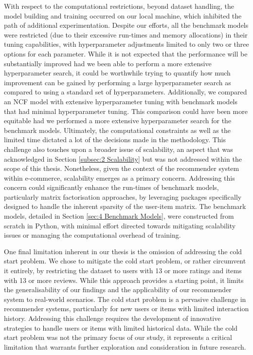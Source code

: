 With respect to the computational restrictions, beyond dataset handling, the model building and training occurred on our local machine, which inhibited the path of additional experimentation. Despite our efforts, all the benchmark models were restricted (due to their excessive run-times and memory allocations) in their tuning capabilities, with hyperparameter adjustments limited to only two or three options for each parameter. While it is not expected that the performance will be substantially improved had we been able to perform a more extensive hyperparameter search, it could be worthwhile trying to quantify how much improvement can be gained by performing a large hyperparameter search as compared to using a standard set of hyperparameters. Additionally, we compared an NCF model with extensive hyperparameter tuning with benchmark models that had minimal hyperparameter tuning. This comparison could have been more equitable had we performed a more extensive hyperparameter search for the benchmark models. Ultimately, the computational constraints as well as the limited time dictated a lot of the decisions made in the methodology. This challenge also touches upon a broader issue of scalability, an aspect that was acknowledged in Section \ref{subsec:2 Scalability} but was not addressed within the scope of this thesis. Nonetheless, given the context of the recommender system within e-commerce, scalability emerges as a primary concern. Addressing this concern could significantly enhance the run-times of benchmark models, particularly matrix factorisation approaches, by leveraging packages specifically designed to handle the inherent sparsity of the user-item matrix. The benchmark models, detailed in Section \ref{sec:4 Benchmark Models}, were constructed from scratch in Python, with minimal effort directed towards mitigating scalability issues or managing the computational overhead of training. 

One final limitation inherent in our thesis is the omission of addressing the cold start problem. We chose to mitigate the cold start problem, or rather circumvent it entirely, by restricting the dataset to users with 13 or more ratings and items with 13 or more reviews. While this approach provides a starting point, it limits the generalisability of our findings and the applicability of our recommender system to real-world scenarios. The cold start problem is a pervasive challenge in recommender systems, particularly for new users or items with limited interaction history. Addressing this challenge requires the development of innovative strategies to handle users or items with limited historical data. While the cold start problem was not the primary focus of our study, it represents a critical limitation that warrants further exploration and consideration in future research.



